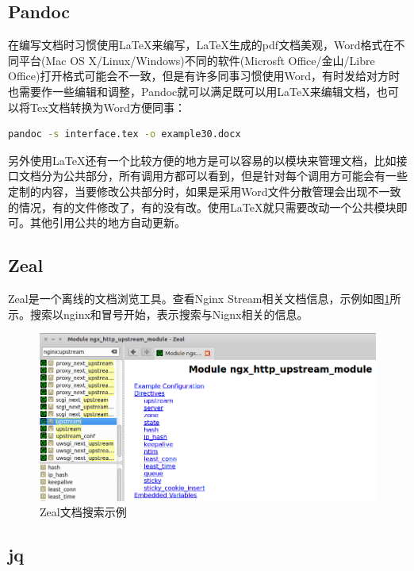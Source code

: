 \documentclass[letter]{book}
\begin{document}
\subsection{Pandoc}

在编写文档时习惯使用\LaTeX{}来编写，\LaTeX{}生成的pdf文档美观，Word格式在不同平台(Mac OS X/Linux/Windows)不同的软件(Microsft Office/金山/Libre Office)打开格式可能会不一致，但是有许多同事习惯使用Word，有时发给对方时也需要作一些编辑和调整，Pandoc就可以满足既可以用\LaTeX{}来编辑文档，也可以将Tex文档转换为Word方便同事：

\begin{lstlisting}[language=Bash]
pandoc -s interface.tex -o example30.docx
\end{lstlisting}

另外使用\LaTeX{}还有一个比较方便的地方是可以容易的以模块来管理文档，比如接口文档分为公共部分，所有调用方都可以看到，但是针对每个调用方可能会有一些定制的内容，当要修改公共部分时，如果是采用Word文件分散管理会出现不一致的情况，有的文件修改了，有的没有改。使用\LaTeX{}就只需要改动一个公共模块即可。其他引用公共的地方自动更新。

\subsection{Zeal}

Zeal是一个离线的文档浏览工具。查看Nginx Stream相关文档信息，示例如图\ref{fig:zealsearch}所示。搜索以nginx和冒号开始，表示搜索与Nignx相关的信息。

\begin{figure}[htbp]
	\centering
	\includegraphics[scale=0.4]{zealsearch.png}
	\caption{Zeal文档搜索示例}
	\label{fig:zealsearch}
\end{figure}

\subsection{jq}
\end{document}
